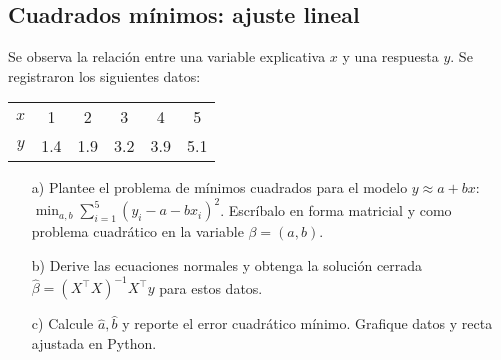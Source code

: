 \documentclass[12pt]{article}
\begin{document}
\subsection{Cuadrados mínimos: ajuste lineal}

Se observa la relación entre una variable explicativa $x$ y una respuesta $y$. Se registraron los siguientes datos:
\begin{center}
\begin{tabular}{cccccc}
\toprule
$x$ & 1 & 2 & 3 & 4 & 5 \\
$y$ & 1.4 & 1.9 & 3.2 & 3.9 & 5.1 \\
\bottomrule
\end{tabular}
\end{center}
\begin{itemize}
    \item[a)] Plantee el problema de mínimos cuadrados para el modelo $y \approx a + b x$: \(\min_{a,b} \sum_{i=1}^5 (y_i - a - b x_i)^2\). Escríbalo en forma matricial y como problema cuadrático en la variable $\beta=(a,b)$.
    \item[b)] Derive las ecuaciones normales y obtenga la solución cerrada $\hat\beta = (X^\top X)^{-1} X^\top y$ para estos datos.
    \item[c)] Calcule $\hat a, \hat b$ y reporte el error cuadrático mínimo. Grafique datos y recta ajustada en Python.
\end{itemize}
\end{document}
